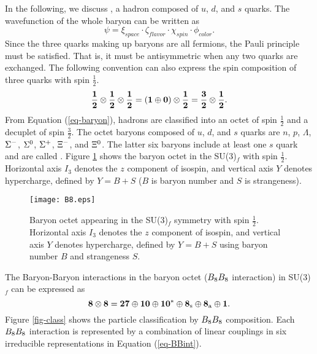 In the following, we discuss , a hadron composed of $u$, $d$, and $s$ quarks. The wavefunction of the whole baryon can be written as
\begin{equation}
  \psi = \xi_{space} \cdot \zeta_{flavor} \cdot \chi_{spin} \cdot \phi_{color}.
\end{equation}
Since the three quarks making up baryons are all fermions, the Pauli principle must be satisfied. That is, it must be antisymmetric when any two quarks are exchanged.  The following convention can also express the spin composition of three quarks with spin $\frac{1}{2}$.
\begin{equation}
    {\bf \frac{1}{2}\otimes\frac{1}{2}\otimes\frac{1}{2}=(1\oplus0)\otimes\frac{1}{2}=\frac{3}{2}\otimes\frac{1}{2}}.
    \label{eq-baryon}
\end{equation}
From Equation (\ref{eq-baryon}), hadrons are classified into an octet of spin $\frac{1}{2}$ and a decuplet of spin $\frac{3}{2}$. The octet baryons composed of $u$, $d$, and $s$ quarks are $n$, $p$, $\Lambda$, $\Sigma^{-}$, $\Sigma^{0}$, $\Sigma^{+}$, $\Xi^{-}$, and $\Xi^{0}$. The latter six baryons include at least one $s$ quark and are called . Figure \ref{fig-B8} shows the baryon octet in the SU(3)$_f$ with spin $\frac{1}{2}$. Horizontal axis $I_{3}$ denotes the $z$ component of isospin, and vertical axis $Y$ denotes hypercharge, defined by $Y = B + S$ ($B$ is baryon number and $S$ is strangeness). 
\begin{figure}[h]
  \begin{center}
  \texttt{[image: B8.eps]}
  \caption{Baryon octet appearing in the SU(3)$_f$ symmetry with spin $\frac{1}{2}$. Horizontal axis $I_{3}$ denotes the $z$ component of isospin, and vertical axis $Y$ denotes hypercharge, defined by $Y = B + S$ using baryon number $B$ and strangeness $S$.}
  \label{fig-B8}
  \end{center}
\end{figure}

The Baryon-Baryon interactions in the baryon octet ($B_{8}B_{8}$ interaction) in SU(3)$_f$ can be expressed as
\begin{equation}
  {\bf 8\otimes 8 = 27\oplus 10\oplus 10^*\oplus 8_{\rm{s}}\oplus 8_{\rm{a}}\oplus 1}. 
  \label{eq-BBint}
\end{equation}
Figure \ref{fig-class} shows the particle classification by $B_{8}B_{8}$ composition. Each $B_{8}B_{8}$ interaction is represented by a combination of linear couplings in six irreducible representations in Equation (\ref{eq-BBint}).

